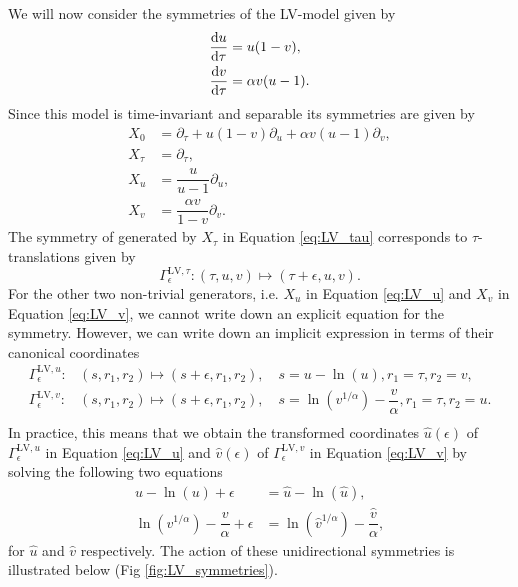 We will now consider the symmetries of the LV-model given by
\begin{equation}
  \begin{split}
    \dv{u}{\tau}&=u(1-v),\\
    \dv{v}{\tau}&=\alpha v(u-1).\\    
    \end{split}
  \label{eq:LV}
\end{equation}
Since this model is time-invariant and separable its symmetries are given by
\begin{align}
  X_0&=\partial_\tau+u(1-v)\partial_u+\alpha v(u-1)\partial_v,\label{eq:LV_0}\\
  X_\tau&=\partial_\tau,\label{eq:LV_tau}\\
  X_u&=\dfrac{u}{u-1}\partial_u,\label{eq:LV_u}\\
  X_v&=\dfrac{\alpha v}{1-v}\partial_v.\label{eq:LV_v}
\end{align}
The symmetry of generated by $X_\tau$ in Equation \eqref{eq:LV_tau} corresponds to $\tau$-translations given by
\begin{equation}
\Gamma^{\mathrm{LV},\tau}_{\epsilon}:(\tau,u,v)\mapsto (\tau+\epsilon,u,v).
\end{equation}
For the other two non-trivial generators, i.e. $X_u$ in Equation \eqref{eq:LV_u} and $X_v$ in Equation \eqref{eq:LV_v}, we cannot write down an explicit equation for the symmetry. However, we can write down an implicit expression in terms of their canonical coordinates
\begin{align}
\Gamma^{\mathrm{LV},u}_{\epsilon}:&(s,r_1,r_2)\mapsto(s+\epsilon,r_1,r_2),\quad s=u-\ln(u),r_1=\tau,r_2=v,\label{eq:LV_u}\\
\Gamma^{\mathrm{LV},v}_{\epsilon}:&(s,r_1,r_2)\mapsto(s+\epsilon,r_1,r_2),\quad s=\ln\left(v^{1/\alpha}\right)-\dfrac{v}{\alpha},r_1=\tau,r_2=u.\label{eq:LV_v}\\
\end{align}
In practice, this means that we obtain the transformed coordinates $\hat{u}(\epsilon)$ of $\Gamma^{\mathrm{LV},u}_{\epsilon}$ in Equation \eqref{eq:LV_u} and $\hat{v}(\epsilon)$ of $\Gamma^{\mathrm{LV},v}_{\epsilon}$ in Equation \eqref{eq:LV_v} by solving the following two equations
\begin{align}
u-\ln(u)+\epsilon&=\hat{u}-\ln(\hat{u}),\label{eq:LV_u_implicit}\\
\ln\left(v^{1/\alpha}\right)-\dfrac{v}{\alpha}+\epsilon&=\ln\left(\hat{v}^{1/\alpha}\right)-\dfrac{\hat{v}}{\alpha},\label{eq:LV_v_implicit}
\end{align}
for $\hat{u}$ and $\hat{v}$ respectively. The action of these unidirectional symmetries is illustrated below (Fig \ref{fig:LV_symmetries}). 


